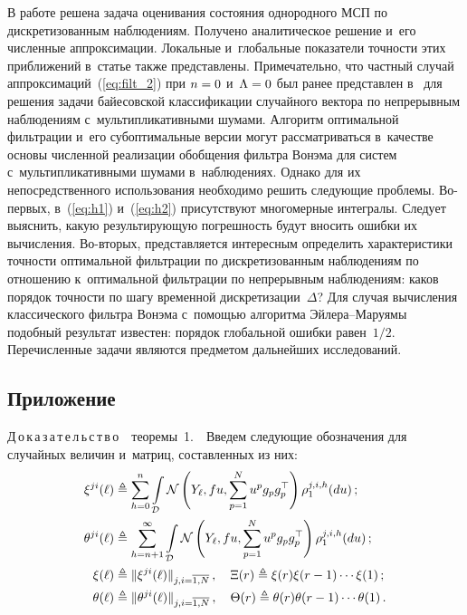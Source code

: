 \begin{multicols}{2}
  В работе решена задача оценивания состояния однородного МСП по 
  дискретизованным наблюдениям. Получено аналитическое решение и~его 
  чис\-лен\-ные аппроксимации. Локальные и~глобальные показатели точ\-ности этих 
  приближений в~статье так\-же пред\-став\-ле\-ны. Примечательно, что  част\-ный случай 
  аппроксимаций~(\ref{eq:filt_2}) при $n\hm=0$ и~$\Lambda\hm=0$ был ранее 
  пред\-став\-лен в~\cite{B_17_1,B_17_2} для решения задачи байесовской классификации 
  случайного вектора по непрерывным наблюдениям с~мультипликативными шумами. 
Алгоритм оптимальной фильт\-ра\-ции и~его субоптимальные версии могут 
рас\-смат\-ри\-вать\-ся в~качестве основы чис\-лен\-ной реализации обобщения фильт\-ра 
Вонэма для сис\-тем с~мультипликативными шумами в~наблюдениях. 
Однако для их непосредственного использования необходимо решить 
следующие проб\-ле\-мы. Во-пер\-вых, в~(\ref{eq:h1}) и~(\ref{eq:h2}) присутствуют
 многомерные интегралы. Следует выяснить, какую результирующую погрешность 
 будут вносить ошибки их вы\-чис\-ле\-ния. Во-вто\-рых, представляется интересным 
 определить характеристики точ\-ности оптимальной фильт\-ра\-ции по дискретизованным 
 наблюдениям по отношению к~оптимальной фильт\-ра\-ции по непрерывным наблюдениям: 
 каков порядок точ\-ности по шагу временной дискретизации~$\Delta$? Для случая 
 вы\-чис\-ле\-ния классического фильт\-ра Вонэма с~по\-мощью алгоритма Эй\-ле\-ра--Ма\-ру\-ямы 
 подобный результат известен: порядок глобальной ошибки равен~${1}/{2}$. 
 Перечисленные задачи являются предметом дальнейших исследований.
 
 
  \vspace*{-10pt}
 
{\small
\subsection*{\raggedleft Приложение} 

\vspace*{-2pt}


\noindent
Д\,о\,к\,а\,з\,а\,т\,е\,л\,ь\,с\,т\,в\,о\ \ теоремы~1.\ \ Введем следующие 
обозначения для случайных величин и~мат\-риц, составленных из них:
\begin{align*}
\xi^{ji}(\ell)&\triangleq 
\sum\limits_{h=0}^n \int\limits_{\mathcal{D}} 
 \mathcal{N}\left(Y_{\ell},f u,\sum\limits_{p=1}^N u^p g_pg_p^{\top}\right)
 \rho^{j,i,h}_{1}(du)\,; \\
  \theta^{ji}(\ell)&\triangleq 
\sum\limits_{h=n+1}^{\infty} \int\limits_{\mathcal{D}} 
 \mathcal{N}\left(Y_{\ell},f u,\sum\limits_{p=1}^N u^p g_pg_p^{\top}\right)
 \rho^{j,i,h}_{1}(du)\,;
\\
 \xi(\ell)&\triangleq \|\xi^{ji}(\ell)\|_{j,i=\overline{1,N}}\,,\quad 
 \Xi(r) \triangleq \xi(r) \xi(r-1)\cdots \xi(1)\,;
 \\
 \theta(\ell)&\triangleq \|\theta^{ji}(\ell)\|_{j,i=\overline{1,N}}\,, \quad 
 \Theta(r) \triangleq \theta(r) \theta(r-1)\cdots \theta(1)\,.
\end{align*}
 
}
\end{multicols}
